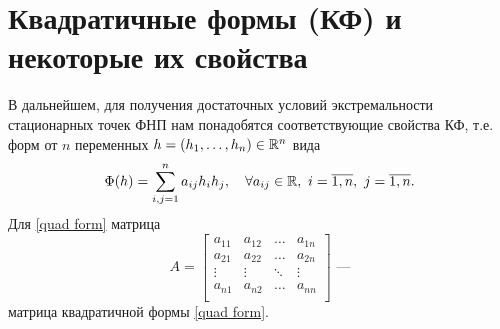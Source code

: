 \documentclass[../../main.tex]{subfiles}
\begin{document}
	\section{Квадратичные формы (КФ) и некоторые их свойства}
	В дальнейшем, для получения достаточных условий экстремальности
	стационарных точек ФНП нам понадобятся соответствующие свойства КФ,
	т.е. форм от $n$ переменных $h = (h_1, \ldots, h_n) \in \mathbb{R}^n$ вида
	\begin{equation}
	\label{quad form}
		\Phi(h) = \sum_{i, j = 1}^n a_{i j} h_i h_j,
		\quad \forall a_{i j} \in \mathbb{R},\ i = \overline{1, n},\ j = \overline{1, n}.
	\end{equation}
	Для \eqref{quad form} матрица
	\begin{equation}
	\label{form matrix}
		A =
		\begin{bmatrix}
			a_{1 1} & a_{1 2} & \ldots & a_{1 n} \\
			a_{2 1} & a_{2 2} & \ldots & a_{2 n} \\
			\vdots & \vdots & \ddots & \vdots \\
			a_{n 1} & a_{n 2} & \ldots & a_{n n} \\
		\end{bmatrix}
		\text{ ---}
	\end{equation}
	матрица квадратичной формы \eqref{quad form}.
	
\end{document}
